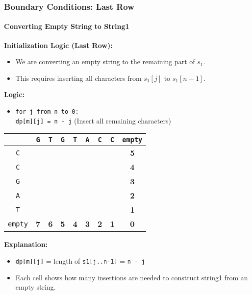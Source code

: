 \documentclass[10pt,aspectratio=43]{beamer}
\begin{document}
\begin{frame}
\frametitle{Boundary Conditions: Last Row}
\framesubtitle{Converting Empty String to String1}

\textbf{Initialization Logic (Last Row):}
\begin{itemize}
    \item We are converting an empty string to the remaining part of $s_1$.
    \item This requires inserting all characters from $s_1[j]$ to $s_1[n-1]$.
\end{itemize}

\vspace{0.2cm}
\textbf{Logic:}
\begin{itemize}
    \item \texttt{for j from n to 0:} \\
    \quad \texttt{dp[m][j] = n - j} \hfill (Insert all remaining characters)
\end{itemize}

\vspace{0.2cm}
\begin{center}
\scriptsize
\begin{tabular}{|c|c|c|c|c|c|c|c|c|}
    \hline
    & \texttt{G} & \texttt{T} & \texttt{G} & \texttt{T} & \texttt{A} & \texttt{C} & \texttt{C} & \texttt{empty} \\ \hline
    \texttt{C} &  &  &  &  &  &  &  & \textbf{5} \\ \hline
    \texttt{C} &  &  &  &  &  &  &  & \textbf{4} \\ \hline
    \texttt{G} &  &  &  &  &  &  &  & \textbf{3} \\ \hline
    \texttt{A} &  &  &  &  &  &  &  & \textbf{2} \\ \hline
    \texttt{T} &  &  &  &  &  &  &  & \textbf{1} \\ \hline
    \texttt{empty} & \textbf{7} & \textbf{6} & \textbf{5} & \textbf{4} & \textbf{3} & \textbf{2} & \textbf{1} & \textbf{0} \\ \hline
\end{tabular}
\end{center}

\vspace{0.2cm}
\textbf{Explanation:}
\begin{itemize}
    \item \texttt{dp[m][j]} = length of \texttt{s1[j..n-1]} = \texttt{n - j}
    \item Each cell shows how many insertions are needed to construct string1 from an empty string.
   
\end{itemize}
\end{frame}
\end{document}
